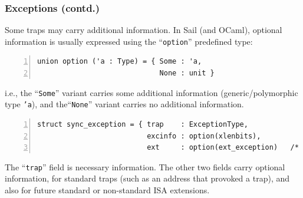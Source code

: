 \documentclass[aspectratio=169]{beamer}
\newcommand{\slidefont}{\scriptsize}
\newcommand{\cf}{\scriptsize\tt}
\begin{document}
\begin{frame}[fragile]
  \frametitle{Exceptions (contd.)}

  \slidefont

  Some traps may carry additional information.  In Sail (and OCaml),
  optional information is usually expressed using the ``{\cf option}''
  predefined type:

  \begin{Verbatim}[frame=single, numbers=left, label = predefined]
union option ('a : Type) = { Some : 'a,
                             None : unit }
  \end{Verbatim}

  i.e., the ``{\cf Some}'' variant carries some additional information
  (generic/polymorphic type {\cf 'a}), and the``{\cf None}'' variant
  carries no additional information.

  \vspace{1ex}

  \begin{Verbatim}[frame=single, numbers=left, label = File riscv\_sync\_exception.sail]
struct sync_exception = { trap    : ExceptionType,
                          excinfo : option(xlenbits),
                          ext     : option(ext_exception)   /* for extensions */ }
  \end{Verbatim}

  \begin{minipage}{\textwidth}
    The ``{\cf trap}'' field is necessary information.  The other two
    fields carry optional information, for standard traps (such as an
    address that provoked a trap), and also for future standard or
    non-standard ISA extensions.
  \end{minipage}

\end{frame}

\end{document}

